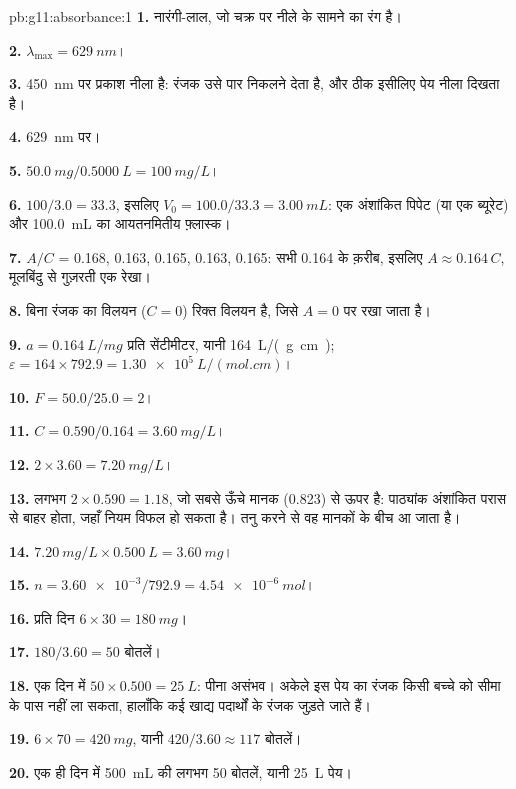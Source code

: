 \begin{solution}{pb:g11:absorbance:1}
\textbf{1.} नारंगी-लाल, जो चक्र पर नीले के सामने का रंग है।

\textbf{2.} $\lambda_{\max} = \qty{629}{nm}$।

\textbf{3.} \qty{450}{nm} पर प्रकाश नीला है: रंजक उसे पार निकलने देता है,
और ठीक इसीलिए पेय नीला दिखता है।

\textbf{4.} \qty{629}{nm} पर।

\textbf{5.} $\qty{50.0}{mg} / \qty{0.5000}{L} = \qty{100}{mg/L}$।

\textbf{6.}  $100 / 3.0 = 33.3$, इसलिए
$V_0 = 100.0 / 33.3 = \qty{3.00}{mL}$: एक अंशांकित पिपेट (या एक
ब्यूरेट) और \qty{100.0}{mL} का आयतनमितीय फ़्लास्क।

\textbf{7.} $A/C$ = 0.168, 0.163, 0.165, 0.163, 0.165: सभी
0.164 के क़रीब, इसलिए $A \approx 0.164\, C$, मूलबिंदु से गुज़रती एक रेखा।

\textbf{8.} बिना रंजक का विलयन ($C = 0$) रिक्त विलयन है, जिसे
$A = 0$ पर रखा जाता है।

\textbf{9.} $a = \qty{0.164}{L/mg}$ प्रति सेंटीमीटर, यानी
\qty{164}{L/(g.cm)}; $\varepsilon = 164 \times 792.9 =
\qty{1.30e5}{L/(mol.cm)}$।

\textbf{10.} $F = 50.0 / 25.0 = 2$।

\textbf{11.} $C = 0.590 / 0.164 = \qty{3.60}{mg/L}$।

\textbf{12.} $2 \times 3.60 = \qty{7.20}{mg/L}$।

\textbf{13.} लगभग $2 \times 0.590 = 1.18$, जो सबसे ऊँचे मानक (0.823) से ऊपर है:
पाठ्यांक अंशांकित परास से बाहर होता, जहाँ नियम विफल हो
सकता है। तनु करने से वह मानकों के बीच आ जाता है।

\textbf{14.} $\qty{7.20}{mg/L} \times \qty{0.500}{L} = \qty{3.60}{mg}$।

\textbf{15.} $n = \num{3.60e-3} / 792.9 = \qty{4.54e-6}{mol}$।

\textbf{16.} प्रति दिन $6 \times 30 = \qty{180}{mg}$।

\textbf{17.} $180 / 3.60 = 50$ बोतलें।

\textbf{18.} एक दिन में $50 \times 0.500 = \qty{25}{L}$: पीना असंभव।
अकेले इस पेय का रंजक किसी बच्चे को सीमा के पास नहीं ला सकता,
हालाँकि कई खाद्य पदार्थों के रंजक जुड़ते जाते हैं।

\textbf{19.} $6 \times 70 = \qty{420}{mg}$, यानी $420 / 3.60 \approx
117$ बोतलें।

\textbf{20.} एक ही दिन में \qty{500}{mL} की लगभग 50 बोतलें, यानी \qty{25}{L} पेय।
\end{solution}
